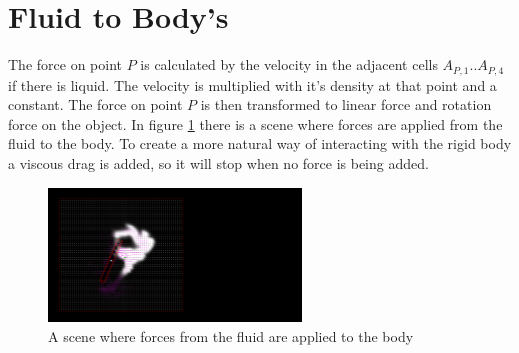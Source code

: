 \section{Fluid to Body's}
The force on point $P$ is calculated by the velocity in the adjacent cells $A_{P,1} .. A_{P,4}$ if there is liquid. The velocity is multiplied with it's density at that point and a constant. The force on point $P$ is then transformed to linear force and rotation force on the object. In figure \ref{fig:FluidToBody} there is a scene where forces are applied from the fluid to the body. To create a more natural way of interacting with the rigid body a viscous drag is added, so it will stop when no force is being added.

\begin{figure}[htb!]
    \centering
    \includegraphics[width=0.6\textwidth]{images/FluidToBody}
    \caption{A scene where forces from the fluid are applied to the body}
    \label{fig:FluidToBody}
\end{figure}